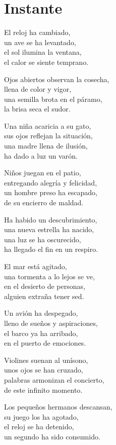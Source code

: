 \section*{Instante}
\label{Instante}

\vspace{1em}
\begin{center}
El reloj ha cambiado,\\ 
un ave se ha levantado,\\ 
el sol ilumina la ventana,\\ 
el calor se siente temprano.

\vspace{1em} 
Ojos abiertos observan la cosecha,\\ 
llena de color y vigor,\\ 
una semilla brota en el páramo,\\ 
la brisa seca el sudor.

\vspace{1em} 
Una niña acaricia a su gato,\\ 
sus ojos reflejan la situación,\\ 
una madre llena de ilusión,\\ 
ha dado a luz un varón.

\vspace{1em} 
Niños juegan en el patio,\\ 
entregando alegría y felicidad,\\ 
un hombre preso ha escapado,\\ 
de su encierro de maldad.

\vspace{1em} 
Ha habido un descubrimiento,\\ 
una nueva estrella ha nacido,\\ 
una luz se ha oscurecido,\\ 
ha llegado el fin en un respiro.

\vspace{1em} 
El mar está agitado,\\ 
una tormenta a lo lejos se ve,\\ 
en el desierto de personas,\\ 
alguien extraña tener sed.

\vspace{1em} 
Un avión ha despegado,\\ 
lleno de sueños y aspiraciones,\\ 
el barco ya ha arribado,\\ 
en el puerto de emociones.

\vspace{1em} 
Violines suenan al unísono,\\ 
unos ojos se han cruzado,\\ 
palabras armonizan el concierto,\\ 
de este infinito momento.

\vspace{1em} 
Los pequeños hermanos descansan,\\ 
su juego los ha agotado,\\ 
el reloj se ha detenido,\\ 
un segundo ha sido consumido.

\end{center}





